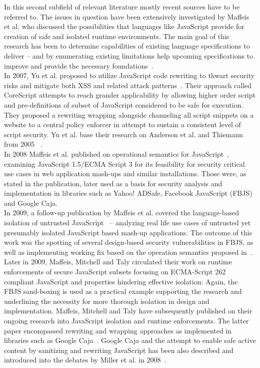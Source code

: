 \begin{itemize}
      In this second subfield of relevant literature mostly recent sources have to be referred to. The issues in question have been extensively investigated by Maffeis et al. who discussed the possibilities that languages like JavaScript provide for creation of safe and isolated runtime environments. The main goal of this research has been to determine capabilities of existing language specifications to deliver -- and by enumerating existing limitations help upcoming specifications to improve and provide the necessary foundations~\cite{MMT-APLAS-TR08,MMT-CSF-TR09,mmt-esorics09}. \\ 

      In 2007, Yu et al. proposed to utilize JavaScript code rewriting to thwart security risks and mitigate both XSS and related attack patterns~\cite{yu2007javascript}. Their approach called CoreScript attempts to reach grander applicability by allowing higher order script and pre-definitions of subset of JavaScript considered to be safe for execution. They proposed a rewriting wrapping alongside channeling all script snippets on a website to a central policy enforcer in attempt to sustain a consistent level of script security. Yu et al. base their research on Anderson et al. and Thiemann from 2005 ~\cite{anderson2005towards,thiemann2005towards}. \\

      In 2008 Maffeis et al. published on operational semantics for JavaScript~\cite{MMT-APLAS-TR08}, examining JavaScript 1.5/ECMA Script 3 for its feasibility for security critical use cases in web application mash-ups and similar installations. Those were, as stated in the publication, later used as a basis for security analysis and implementation in libraries such as Yahoo! ADSafe, Facebook JavaScript (FBJS) and Google Caja. \\

      In 2009, a follow-up publication by Maffeis et al. covered the language-based isolation of untrusted JavaScript~\cite{MMT-CSF-TR09} -- analyzing real life use cases of untrusted yet presumably isolated JavaScript based mash-up applications. The outcome of this work was the  spotting of several design-based security vulnerabilities in FBJS, as well as implementing working fix based on the operation semantics proposed in~\cite{MMT-APLAS-TR08}. Later in 2009, Maffeis, Mitchell and Taly circulated their work on runtime enforcements of secure JavaScript subsets focusing on ECMA-Script 262 compliant JavaScript and properties hindering effective isolation: Again, the FBJS sand-boxing is used as a practical example supporting the research and underlining the necessity for more thorough isolation in design and implementation. Maffeis, Mitchell and Taly have subsequently published on their ongoing research into JavaScript isolation and runtime enforcements. The latter paper encompassed rewriting and wrapping approaches as implemented in libraries such as Google Caja~\cite{mmt-esorics09}. Google Caja and the attempt to enable safe active content by sanitizing and rewriting JavaScript has been also described and introduced into the debates by Miller et al. in 2008~\cite{miller2008caja}. \\
  

\end{itemize}
